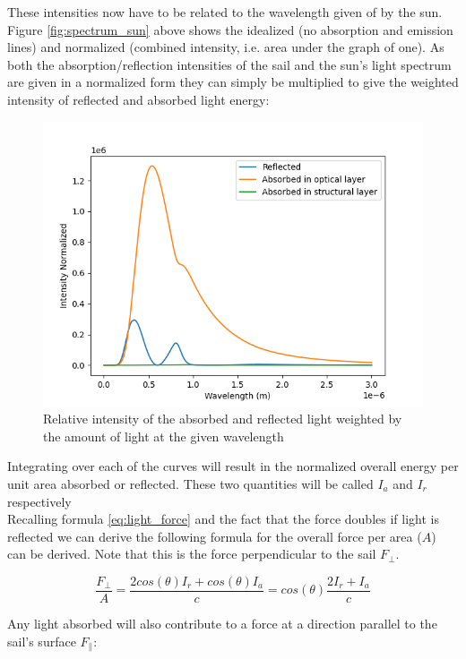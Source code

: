 \documentclass[14pt]{article}
\begin{document}
These intensities now have to be related to the wavelength given of by the sun. Figure \ref{fig:spectrum_sun} above
shows the idealized (no absorption and emission lines) and normalized (combined intensity, i.e. area under the graph of one). As both
the absorption/reflection intensities of the sail and the sun's light spectrum are given in a normalized form
they can simply be multiplied to give the weighted intensity of reflected and absorbed light energy:

\begin{figure}[H]
  \includegraphics[width=14cm]{./python/output/reflection_and_absorption_aluminum_sail_weighted.png}
  \caption{Relative intensity of the absorbed and reflected light weighted by the amount of light at the given wavelength}
  \label{fig:aluminum_sail_weighted}
\end{figure}

Integrating over each of the curves will result in the normalized overall energy per unit area absorbed or reflected.
These two quantities will be called $I_{a}$ and $I_{r}$ respectively\\
Recalling formula \ref{eq:light_force} and the fact that the force doubles if light is reflected we can derive the following 
formula for the overall force per area ($A$) can be derived. Note that this is the force 
perpendicular to the sail $F_{\perp}$. 

$$
  \frac{F_{\perp}}{A} = \frac{ 2 cos(\theta) I_{r} + cos(\theta) I_{a} }{c}
  = cos(\theta) \frac{ 2  I_{r} + I_{a} }{c}
$$

Any light absorbed will also contribute to a force at a direction parallel to the sail's surface $F_{\parallel}$:
\end{document}
